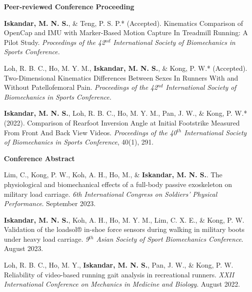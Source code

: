 \documentclass[../main.tex]{subfiles}
\begin{document}
        \textbf{Peer-reviewed Conference Proceeding}
        \def\labelprefix{C}
        \begin{etaremune}
            \item\label{conference: isbs2024opencap} {\textbf{Iskandar, M. N. S.}, \& Teng, P. S. P.* (Accepted). Kinematics Comparison of OpenCap and IMU with Marker-Based Motion Capture In Treadmill Running: A Pilot Study. \textit{Proceedings of the 42$^{nd}$ International Society of Biomechanics in Sports Conference.} \href{https://github.com/Shahril-Iskandar/publication-conference-validation}{\faGithub}}
        
            \item\label{conference: isbs2024raystudy} Loh, R. B. C., Ho, M. Y. M., {\textbf{Iskandar, M. N. S.}, \& Kong, P. W.* (Accepted). Two-Dimensional Kinematics Differences Between Sexes In Runners With and Without Patellofemoral Pain. \textit{Proceedings of the 42$^{nd}$ International Society of Biomechanics in Sports Conference.}}
            
            \item\label{conference: isbs2022} {\textbf{Iskandar, M. N. S.}, Loh, R. B. C., Ho, M. Y. M., Pan, J. W., \& Kong, P. W.* (2022). Comparison of Rearfoot Inversion Angle at Initial Footstrike Measured From Front And Back View Videos. \textit{Proceedings of the 40$^{th}$ International Society of Biomechanics in Sports Conference}, 40(1), 291. \href{https://commons.nmu.edu/isbs/vol40/iss1/70/}{\faFilePdfO}}
        \end{etaremune}

        \textbf{Conference Abstract}
        \def\labelprefix{CA}
        \begin{etaremune}
            \item\label{conference_abstract: cherylMilitary} {Lim, C., Kong, P. W., Koh, A. H., Ho, M., \& \textbf{Iskandar, M. N. S.}. The physiological and biomechanical effects of a full-body passive exoskeleton on military load carriage. \textit{6th International Congress on Soldiers' Physical Performance}. September 2023. {\href{https://cdn.asp.events/CLIENT_CLDD_9BDAB70C_5056_B733_4934A7872C9C46B0/sites/dsei-2023/media/ICSPP_program_book.pdf}{\faFilePdfO}}}

            \item\label{conference_abstract: assbLoadsolValidation} {\textbf{Iskandar, M. N. S.}, Koh, A. H., Ho, M. Y. M., Lim, C. X. E., \& Kong, P. W. Validation of the loadsol® in-shoe force sensors during walking in military boots under heavy load carriage. \textit{9$^{th}$ Asian Society of Sport Biomechanics Conference}. August 2023. }
            
            \item\label{conference_abstract: rayReliability} {Loh, R. B. C., Ho, M. Y., \textbf{Iskandar, M. N. S.}, Pan, J. W., \& Kong, P. W. Reliability of video-based running gait analysis in recreational runners. \textit{XXII International Conference on Mechanics in Medicine and Biology}. August 2022.}
        \end{etaremune}
        
\end{document}
